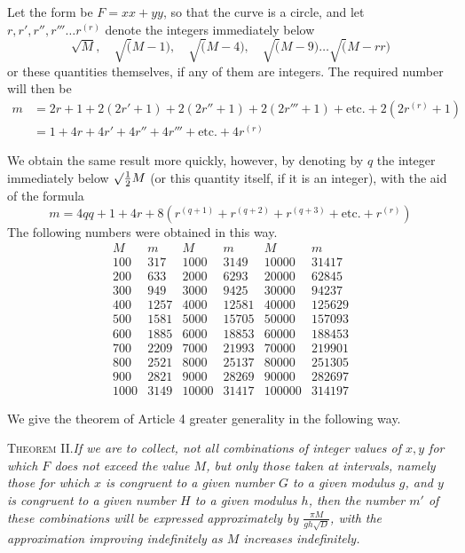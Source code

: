 Let the form be $F=xx+yy$, so that the curve is a circle, and let $r,r',r'',r'''\ldots r^{(r)}$ denote the integers immediately below
\[
\surd M,\quad\surd(M-1),\quad\surd(M-4),\quad\surd(M-9)\ldots\surd(M-rr)
\]
or these quantities themselves, if any of them are integers. The required number will then be
\[
\begin{aligned}
m&=2r+1+2(2r'+1)+2(2r''+1)+2(2r'''+1)+\text{etc.}+2(2r^{(r)}+1)\\
&=1+4r+4r'+4r''+4r'''+\text{etc.}+4r^{(r)}
\end{aligned}
\]

We obtain the same result more quickly, however, by denoting by $q$ the integer immediately
below $\surd\tfrac12 M$ (or this quantity itself, if it is an integer), with the aid of the formula
\[
m=4qq+1+4r+8(r^{(q+1)}+r^{(q+2)}+r^{(q+3)}+\text{etc.}+r^{(r)})
\]
The following numbers were obtained in this way.
\[
\begin{array}{r|r||r|r||r|r}
M&m&M&m&M&m\\\hline
100&317&1000&3149&10000&31417\\
200&633&2000&6293&20000&62845\\
300&949&3000&9425&30000&94237\\
400&1257&4000&12581&40000&125629\\
500&1581&5000&15705&50000&157093\\
600&1885&6000&18853&60000&188453\\
700&2209&7000&21993&70000&219901\\
800&2521&8000&25137&80000&251305\\
900&2821&9000&28269&90000&282697\\
1000&3149&10000&31417&100000&314197
\end{array}
\]

We give the theorem of Article 4 greater generality in the following way.

\textsc{Theorem II.}\quad\emph{If we are to collect, not all combinations of integer values of $x,y$ for which $F$ does not exceed the value $M$, but only those taken at intervals, namely those for which $x$ is congruent to a given number $G$ to a given modulus $g$, and $y$ is congruent to a given number $H$ to a given modulus $h$, then the number $m'$ of these combinations will be expressed approximately by $\frac{\pi M}{gh\surd D}$, with the approximation improving indefinitely as $M$ increases indefinitely.}


